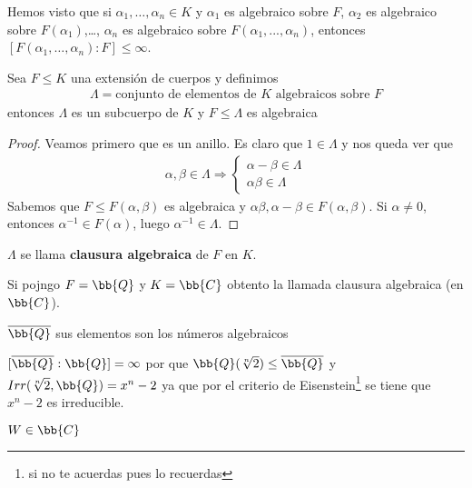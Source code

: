 \begin{observacion} %
    Hemos visto que si $\alpha_1, \dots, \alpha_n \in K$ y $\alpha_1$ es algebraico sobre $F$, $\alpha_2$ es algebraico sobre $F(\alpha_1)$,\dots, $\alpha_n$ es algebraico sobre $F(\alpha_1, ..., \alpha_n)$, entonces $[F(\alpha_1, \dots, \alpha_n):F]\leq \infty$.
\end{observacion}

\begin{coro}
    Sea $F \leq K$ una extensión de cuerpos y definimos
    \begin{gather*}
        \Lambda = \text{conjunto de elementos de }K\text{ algebraicos sobre }F
    \end{gather*}
    entonces $\Lambda$ es un subcuerpo de $K$ y $F\leq \Lambda$ es algebraica
    \begin{proof}
        Veamos primero que es un anillo. Es claro que $1\in \Lambda$ y nos queda ver que
        \begin{gather*}
            \alpha, \beta \in \Lambda \Rightarrow \left\{
            \begin{array}{l}
                \alpha - \beta \in \Lambda\\
                \alpha\beta \in \Lambda
            \end{array}
            \right.
        \end{gather*}
        Sabemos que $F\leq F(\alpha, \beta)$ es algebraica y $\alpha\beta, \alpha - \beta \in F(\alpha, \beta)$.
        Si $\alpha\neq 0$, entonces $\alpha^{-1}\in F(\alpha)$, luego $\alpha^{-1}\in \Lambda$.
    \end{proof}
\end{coro}

\begin{notacion}
    $\Lambda$ se llama \textbf{clausura algebraica} de $F$ en $K$.
\end{notacion}

\begin{ejemplo}
    Si pojngo $F=\bb{Q}$ y $K=\bb{C}$ obtento la llamada clausura algebraica (en $\bb{C}$).
\end{ejemplo}

\begin{notacion}
    $\overline{\bb{Q}}$ sus elementos son los números algebraicos
\end{notacion}

\begin{ejemplo}
    $[\overline{\bb{Q}} : \bb{Q}]= \infty$ por que $\bb{Q}(\sqrt[n]{2})\leq \overline{\bb{Q}}$ y $Irr(\sqrt[n]{2}, \bb{Q}) = x^n -2$ ya que por el criterio de Eisenstein\footnote{si no te acuerdas pues lo recuerdas} se tiene que $x^n -2$ es irreducible.
\end{ejemplo}

\begin{ejemplo}
    $W\in \bb{C}$ 
\end{ejemplo}